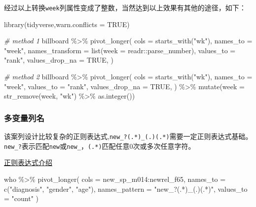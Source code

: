 \documentclass[
]{book}
\newenvironment{Shaded}{\begin{snugshade}}{\end{snugshade}}
\newcommand{\AttributeTok}[1]{\textcolor[rgb]{0.77,0.63,0.00}{#1}}
\newcommand{\CommentTok}[1]{\textcolor[rgb]{0.56,0.35,0.01}{\textit{#1}}}
\newcommand{\ConstantTok}[1]{\textcolor[rgb]{0.00,0.00,0.00}{#1}}
\newcommand{\FunctionTok}[1]{\textcolor[rgb]{0.00,0.00,0.00}{#1}}
\newcommand{\NormalTok}[1]{#1}
\newcommand{\SpecialCharTok}[1]{\textcolor[rgb]{0.00,0.00,0.00}{#1}}
\newcommand{\StringTok}[1]{\textcolor[rgb]{0.31,0.60,0.02}{#1}}
\begin{document}
经过以上转换\texttt{week}列属性变成了整数，当然达到以上效果有其他的途径，如下：

\begin{Shaded}
\begin{Highlighting}[]
\FunctionTok{library}\NormalTok{(tidyverse,}\AttributeTok{warn.conflicts =} \ConstantTok{TRUE}\NormalTok{)}

\CommentTok{\# method 1}
\NormalTok{billboard }\SpecialCharTok{\%\textgreater{}\%} 
  \FunctionTok{pivot\_longer}\NormalTok{(}
    \AttributeTok{cols =} \FunctionTok{starts\_with}\NormalTok{(}\StringTok{"wk"}\NormalTok{), }
    \AttributeTok{names\_to =} \StringTok{"week"}\NormalTok{, }
    \AttributeTok{names\_transform =} \FunctionTok{list}\NormalTok{(}\AttributeTok{week =}\NormalTok{ readr}\SpecialCharTok{::}\NormalTok{parse\_number),}
    \AttributeTok{values\_to =} \StringTok{"rank"}\NormalTok{,}
    \AttributeTok{values\_drop\_na =} \ConstantTok{TRUE}\NormalTok{,}
\NormalTok{)}

\CommentTok{\# method 2}
\NormalTok{billboard }\SpecialCharTok{\%\textgreater{}\%}
  \FunctionTok{pivot\_longer}\NormalTok{(}
    \AttributeTok{cols =} \FunctionTok{starts\_with}\NormalTok{(}\StringTok{"wk"}\NormalTok{),}
    \AttributeTok{names\_to =} \StringTok{"week"}\NormalTok{,}
    \AttributeTok{values\_to =} \StringTok{"rank"}\NormalTok{,}
    \AttributeTok{values\_drop\_na =} \ConstantTok{TRUE}\NormalTok{,}
\NormalTok{  ) }\SpecialCharTok{\%\textgreater{}\%}
  \FunctionTok{mutate}\NormalTok{(}\AttributeTok{week =} \FunctionTok{str\_remove}\NormalTok{(week, }\StringTok{"wk"}\NormalTok{) }\SpecialCharTok{\%\textgreater{}\%} \FunctionTok{as.integer}\NormalTok{())}
\end{Highlighting}
\end{Shaded}

\hypertarget{ux591aux53d8ux91cfux5217ux540d}{%
\subsubsection{多变量列名}\label{ux591aux53d8ux91cfux5217ux540d}}

该案列设计比较复杂的正则表达式,\texttt{new\_?(.*)\_(.)(.*)}需要一定正则表达式基础。
\texttt{new\_?}表示匹配\texttt{new}或\texttt{new\_}，\texttt{(.*)}匹配任意0次或多次任意字符。

\href{https://www.runoob.com/regexp/regexp-syntax.html}{正则表达式介绍}

\begin{Shaded}
\begin{Highlighting}[]
\NormalTok{who }\SpecialCharTok{\%\textgreater{}\%} \FunctionTok{pivot\_longer}\NormalTok{(}
  \AttributeTok{cols =}\NormalTok{ new\_sp\_m014}\SpecialCharTok{:}\NormalTok{newrel\_f65,}
  \AttributeTok{names\_to =} \FunctionTok{c}\NormalTok{(}\StringTok{"diagnosis"}\NormalTok{, }\StringTok{"gender"}\NormalTok{, }\StringTok{"age"}\NormalTok{), }
  \AttributeTok{names\_pattern =} \StringTok{"new\_?(.*)\_(.)(.*)"}\NormalTok{,}
  \AttributeTok{values\_to =} \StringTok{"count"}
\NormalTok{)}
\end{Highlighting}
\end{Shaded}
\end{document}
